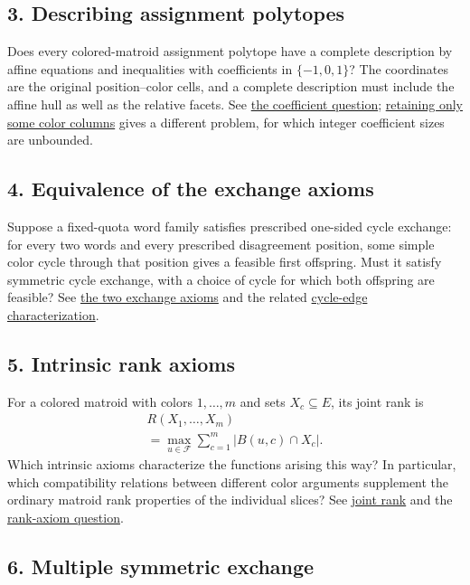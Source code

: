 \subsection[problem3]{3. Describing assignment polytopes}

Does every colored-matroid assignment polytope have a complete description
by affine equations and inequalities with coefficients in $\{-1,0,1\}$?
The coordinates are the original position--color cells, and a complete
description must include the affine hull as well as the relative facets.
See \href{polytope.htm#generalPolytopeDescription}{the coefficient question};
\href{projections.htm}{retaining only some color columns} gives a different
problem, for which integer coefficient sizes are unbounded.

\subsection[problem4]{4. Equivalence of the exchange axioms}

Suppose a fixed-quota word family satisfies prescribed one-sided cycle
exchange: for every two words and every prescribed disagreement position,
some simple color cycle through that position gives a feasible first
offspring. Must it satisfy symmetric cycle exchange, with a choice of cycle
for which both offspring are feasible?
See \href{intro.htm#cyclicExchange}{the two exchange axioms} and the related
\href{polytope.htm#generalPolytopeDescription}{cycle-edge characterization}.

\subsection[problem5]{5. Intrinsic rank axioms}

For a colored matroid with colors $1,\dotsc,m$ and sets $X_c\subseteq E$,
its joint rank is
\[
 \begin{gathered}
 R(X_1,\dotsc,X_m)\\
 =\max_{u\in\mathcal F}\sum_{c=1}^m|B(u,c)\cap X_c|.
 \end{gathered}
\]
Which intrinsic axioms characterize the functions arising this way?
In particular, which compatibility relations between different color
arguments supplement the ordinary matroid rank properties of the individual
slices? See \href{rank-flats.htm#jointRank}{joint rank} and the
\href{rank-flats.htm#valuatedCompletions}{rank-axiom question}.

\subsection[problem6]{6. Multiple symmetric exchange}

